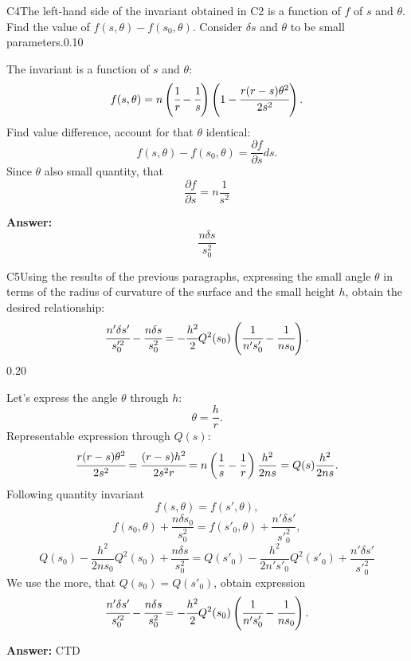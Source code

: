 \documentclass[11pt,a4paper]{article}
\begin{document}
\begin{solcard}{C4}{The left-hand side of the invariant obtained in C2 is a function of $f$ of $s$ and $\theta$. Find the value of $f(s,\theta)-f(s_0,\theta)$. Consider $\delta s$ and $\theta$ to be small parameters.}{0.10}

The invariant is a function of $s$ and $\theta$: $$f(s,\theta) = n\left(\cfrac{1}{r}-\cfrac{1}{s}\right)\left(1-\cfrac{r(r-s)\theta^2}{2s^2}\right).$$ Find value difference, account for that $\theta$ identical: $$f(s,\theta)-f(s_0,\theta) = \frac{\partial f}{\partial s}ds.$$ Since $\theta$ also small quantity, that $$\frac{\partial f}{\partial s} = n \frac{1}{s^2}$$

\par\smallskip\noindent\textbf{Answer:} $$\frac{n \delta s}{s_0^2}$$
\end{solcard}

\begin{solcard}{C5}{Using the results of the previous paragraphs, expressing the small angle $\theta$ in terms of the radius of curvature of the surface and the small height $h$, obtain the desired relationship: $$ \cfrac{n'\delta s'}{s'^2_0}-\cfrac{n\delta s}{s^2_0}=-\cfrac{h^2}{2} Q^2(s_0)\left(\cfrac{1}{n's'_0}-\cfrac{1}{ns_0}\right). $$}{0.20}

Let's express the angle $\theta$ through $h$: $$\theta = \frac{h}{r}.$$ Representable expression through $Q(s)$: $$\cfrac{r(r-s)\theta^2}{2s^2}=\cfrac{(r-s)h^2}{2s^2 r}=n\left(\frac{1}{s}-\frac{1}{r} \right) \frac{h^2}{2ns}=Q(s) \frac{h^2}{2ns}.$$ Following quantity invariant $$f(s, \theta) = f(s', \theta),$$ $$f(s_0, \theta) + \frac{n \delta s_0}{s_0^2} = f(s'_0, \theta) + \frac{n' \delta s'}{{s'}_0^2},$$ $$ $$ $$ Q(s_0) - \frac{h^2}{2ns_0}Q^2(s_0) + \frac{n \delta s}{s_0^2} = Q(s'_0) - \frac{h^2}{2n's'_0}Q^2(s'_0) + \frac{n' \delta s'}{{s'}_0^2}$$ We use the more, that $Q(s_0)=Q(s'_0)$, obtain expression $$ \cfrac{n'\delta s'}{s'^2_0}-\cfrac{n\delta s}{s^2_0}=-\cfrac{h^2}{2} Q^2(s_0)\left(\cfrac{1}{n's'_0}-\cfrac{1}{ns_0}\right). $$

\par\smallskip\noindent\textbf{Answer:} CTD
\end{solcard}
\end{document}
